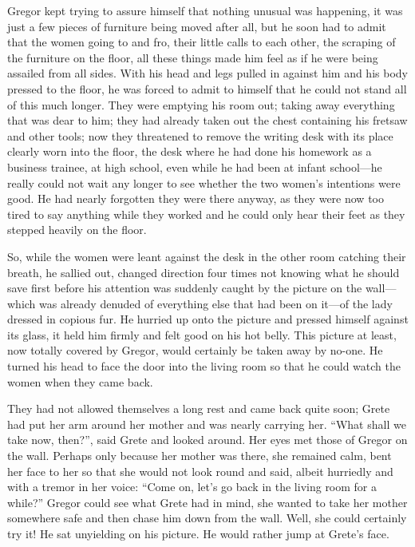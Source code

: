 Gregor kept trying to assure himself that nothing unusual was
happening, it was just a few pieces of furniture being moved after all,
but he soon had to admit that the women going to and fro, their little
calls to each other, the scraping of the furniture on the floor, all
these things made him feel as if he were being assailed from all sides.
With his head and legs pulled in against him and his body pressed to
the floor, he was forced to admit to himself that he could not stand
all of this much longer. They were emptying his room out; taking away
everything that was dear to him; they had already taken out the chest
containing his fretsaw and other tools; now they threatened to remove
the writing desk with its place clearly worn into the floor, the desk
where he had done his homework as a business trainee, at high school,
even while he had been at infant school—he really could not wait any
longer to see whether the two women’s intentions were good. He had
nearly forgotten they were there anyway, as they were now too tired to
say anything while they worked and he could only hear their feet as
they stepped heavily on the floor.

So, while the women were leant against the desk in the other room
catching their breath, he sallied out, changed direction four times not
knowing what he should save first before his attention was suddenly
caught by the picture on the wall—which was already denuded of
everything else that had been on it—of the lady dressed in copious fur.
He hurried up onto the picture and pressed himself against its glass,
it held him firmly and felt good on his hot belly. This picture at
least, now totally covered by Gregor, would certainly be taken away by
no-one. He turned his head to face the door into the living room so
that he could watch the women when they came back.

They had not allowed themselves a long rest and came back quite soon;
Grete had put her arm around her mother and was nearly carrying her.
“What shall we take now, then?”, said Grete and looked around. Her eyes
met those of Gregor on the wall. Perhaps only because her mother was
there, she remained calm, bent her face to her so that she would not
look round and said, albeit hurriedly and with a tremor in her voice:
“Come on, let’s go back in the living room for a while?” Gregor could
see what Grete had in mind, she wanted to take her mother somewhere
safe and then chase him down from the wall. Well, she could certainly
try it! He sat unyielding on his picture. He would rather jump at
Grete’s face.

